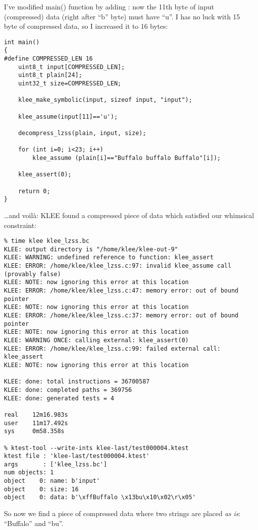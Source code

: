 I've modified main() function by adding : now the 11th byte of input (compressed) data (right after ``b'' byte) must have ``u''.
I has no luck with 15 byte of compressed data, so I increased it to 16 bytes:

\begin{lstlisting}
int main()
{
#define COMPRESSED_LEN 16
	uint8_t input[COMPRESSED_LEN];
	uint8_t plain[24];
	uint32_t size=COMPRESSED_LEN;
  
	klee_make_symbolic(input, sizeof input, "input");
	
	klee_assume(input[11]=='u');
	
	decompress_lzss(plain, input, size);

	for (int i=0; i<23; i++)
		klee_assume (plain[i]=="Buffalo buffalo Buffalo"[i]);

	klee_assert(0);
	
	return 0;
}
\end{lstlisting}

\dots and voilà: KLEE found a compressed piece of data which satisfied our whimsical constraint:

\begin{lstlisting}
% time klee klee_lzss.bc
KLEE: output directory is "/home/klee/klee-out-9"
KLEE: WARNING: undefined reference to function: klee_assert
KLEE: ERROR: /home/klee/klee_lzss.c:97: invalid klee_assume call (provably false)
KLEE: NOTE: now ignoring this error at this location
KLEE: ERROR: /home/klee/klee_lzss.c:47: memory error: out of bound pointer
KLEE: NOTE: now ignoring this error at this location
KLEE: ERROR: /home/klee/klee_lzss.c:37: memory error: out of bound pointer
KLEE: NOTE: now ignoring this error at this location
KLEE: WARNING ONCE: calling external: klee_assert(0)
KLEE: ERROR: /home/klee/klee_lzss.c:99: failed external call: klee_assert
KLEE: NOTE: now ignoring this error at this location

KLEE: done: total instructions = 36700587
KLEE: done: completed paths = 369756
KLEE: done: generated tests = 4

real    12m16.983s
user    11m17.492s
sys     0m58.358s

% ktest-tool --write-ints klee-last/test000004.ktest
ktest file : 'klee-last/test000004.ktest'
args       : ['klee_lzss.bc']
num objects: 1
object    0: name: b'input'
object    0: size: 16
object    0: data: b'\xffBuffalo \x13bu\x10\x02\r\x05'
\end{lstlisting}

So now we find a piece of compressed data where two strings are placed \textit{as is}: ``Buffalo'' and ``bu''.

